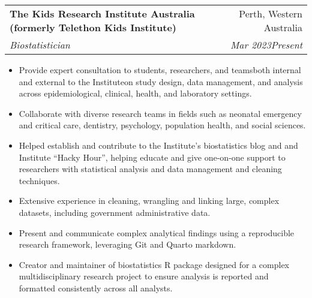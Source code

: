 \documentclass[letterpaper,10.8pt]{article}
\makeatletter
\newcommand{\resumeItem}[2]{
  \item\small{
    \textbf{#1}{#2 \vspace{-2pt}}
  }
}
\newcommand{\resumeSubheading}[4]{
  \vspace{-1pt}\item
    \begin{tabular*}{0.97\textwidth}{l@{\extracolsep{\fill}}r}
      \textbf{#1} & #2 \\
      \textit{\small#3} & \textit{\small #4} \\
    \end{tabular*}\vspace{-5pt}
}
\newcommand{\resumeItemListStart}{\begin{itemize}}
\newcommand{\resumeItemListEnd}{\end{itemize}\vspace{-5pt}}
\makeatother
\begin{document}
    \resumeSubheading
    {The Kids Research Institute Australia (formerly Telethon Kids Institute)}{Perth, Western Australia}
    {Biostatistician}{Mar 2023\textendash Present}
    \resumeItemListStart
        \resumeItem{}{Provide expert consultation to students, researchers, and teams\textemdash both internal and external to the Institute\textemdash on study design, data management, and analysis across epidemiological, clinical, health, and laboratory settings.}
        \resumeItem{}{Collaborate with diverse research teams in fields such as neonatal emergency and critical care, dentistry, psychology, population health, and social sciences.}
        \resumeItem{}{Helped establish and contribute to the Institute's biostatistics blog and and Institute ``Hacky Hour'', helping educate and give one-on-one support to researchers with statistical analysis and data management and cleaning techniques.}
        \resumeItem{}{Extensive experience in cleaning, wrangling and linking large, complex datasets, including government administrative data.}
        \resumeItem{}{Present and communicate complex analytical findings using a reproducible research framework, leveraging Git and Quarto markdown.}
        \resumeItem{}{Creator and maintainer of biostatistics R package designed for a complex multidisciplinary research project to ensure analysis is reported and formatted consistently across all analysts.}
    \resumeItemListEnd
    
\end{document}
